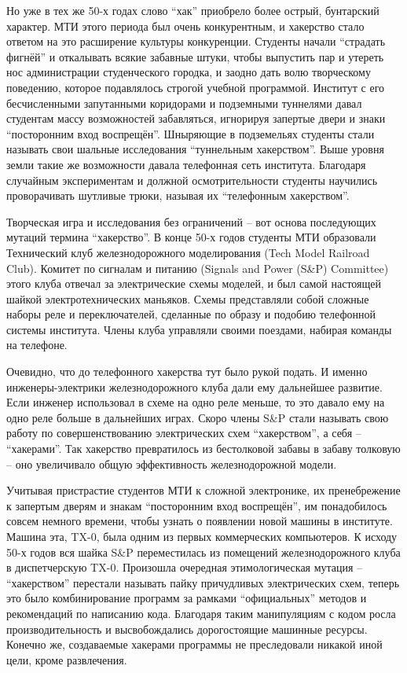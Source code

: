 Но уже в тех же 50-х годах слово \enquote{хак} приобрело более острый, бунтарский характер. МТИ этого периода был очень конкурентным, и хакерство стало ответом на это расширение культуры конкуренции. Студенты начали \enquote{страдать фигнёй} и откалывать всякие забавные штуки, чтобы выпустить пар и утереть нос администрации студенческого городка, и заодно дать волю творческому поведению, которое подавлялось строгой учебной программой. Институт с его бесчисленными запутанными коридорами и подземными туннелями давал студентам массу возможностей забавляться, игнорируя запертые двери и знаки \enquote{посторонним вход воспрещён}. Шныряющие в подземельях студенты стали называть свои шальные исследования \enquote{туннельным хакерством}. Выше уровня земли такие же возможности давала телефонная сеть института. Благодаря случайным экспериментам и должной осмотрительности студенты научились проворачивать шутливые трюки, называя их \enquote{телефонным хакерством}.

Творческая игра и исследования без ограничений -- вот основа последующих мутаций термина \enquote{хакерство}. В конце 50-х годов студенты МТИ образовали Технический клуб железнодорожного моделирования (Tech Model Railroad Club). Комитет по сигналам и питанию (Signals and Power (S\&P) Committee) этого клуба отвечал за электрические схемы моделей, и был самой настоящей шайкой электротехнических маньяков. Схемы представляли собой сложные наборы реле и переключателей, сделанные по образу и подобию телефонной системы института. Члены клуба управляли своими поездами, набирая команды на телефоне.

Очевидно, что до телефонного хакерства тут было рукой подать. И именно инженеры-электрики железнодорожного клуба дали ему дальнейшее развитие. Если инженер использовал в схеме на одно реле меньше, то это давало ему на одно реле больше в дальнейших играх. Скоро члены S\&P стали называть свою работу по совершенствованию электрических схем \enquote{хакерством}, а себя -- \enquote{хакерами}. Так хакерство превратилось из бестолковой забавы в забаву толковую -- оно увеличивало общую эффективность железнодорожной модели.

Учитывая пристрастие студентов МТИ к сложной электронике, их пренебрежение к запертым дверям и знакам \enquote{посторонним вход воспрещён}, им понадобилось совсем немного времени, чтобы узнать о появлении новой машины в институте. Машина эта, TX-0, была одним из первых коммерческих компьютеров. К исходу 50-х годов вся шайка S\&P переместилась из помещений железнодорожного клуба в диспетчерскую TX-0. Произошла очередная этимологическая мутация -- \enquote{хакерством} перестали называть пайку причудливых электрических схем, теперь это было комбинирование программ за рамками \enquote{официальных} методов и рекомендаций по написанию кода. Благодаря таким манипуляциям с кодом росла производительность и высвобождались дорогостоящие машинные ресурсы. Конечно же, создаваемые хакерами программы не преследовали никакой иной цели, кроме развлечения.

